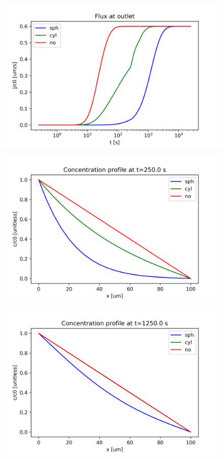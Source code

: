 \documentclass[]{article}
\begin{document}
\begin{figure}[h]
	\centering
	\includegraphics[width=\linewidth]{figs/flux}
	\label{fig:flux}
\end{figure}

\begin{figure}[h]
	\centering
	\includegraphics[width=\linewidth]{figs/profile999}
	\label{fig:profile999}
\end{figure}

\begin{figure}[h]
	\centering
	\includegraphics[width=\linewidth]{figs/profile4999}
	\label{fig:profile4999}
\end{figure}
\end{document}
